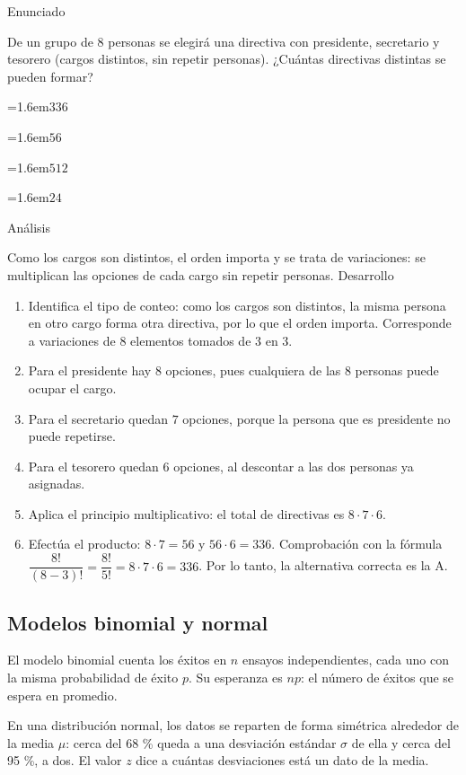 \documentclass[10pt,a4paper,twocolumn]{article}
\newcommand{\alternativa}[2]{\par\noindent\hangindent=1.6em\hangafter=1\makebox[1.6em][l]{\tecla{#1}}#2\par}
\newcommand{\clave}[1]{\par\smallskip{\sffamily\footnotesize\color{esmeralda} Clave \teclaok{#1}}\par}
\begin{document}
\begin{ejemplo}
{\sffamily\footnotesize\color{zinc500} Enunciado}\par
De un grupo de 8 personas se elegirá una directiva con presidente, secretario y tesorero (cargos distintos, sin repetir personas). ¿Cuántas directivas distintas se pueden formar?
\alternativa{A}{$336$}
\alternativa{B}{$56$}
\alternativa{C}{$512$}
\alternativa{D}{$24$}
\clave{A}
{\sffamily\footnotesize\color{zinc500} Análisis}\par Como los cargos son distintos, el orden importa y se trata de variaciones: se multiplican las opciones de cada cargo sin repetir personas.
{\sffamily\footnotesize\color{zinc500} Desarrollo}
\begin{enumerate}
  \item Identifica el tipo de conteo: como los cargos son distintos, la misma persona en otro cargo forma otra directiva, por lo que el orden importa. Corresponde a variaciones de $8$ elementos tomados de $3$ en $3$.
  \item Para el presidente hay $8$ opciones, pues cualquiera de las 8 personas puede ocupar el cargo.
  \item Para el secretario quedan $7$ opciones, porque la persona que es presidente no puede repetirse.
  \item Para el tesorero quedan $6$ opciones, al descontar a las dos personas ya asignadas.
  \item Aplica el principio multiplicativo: el total de directivas es $8\cdot 7\cdot 6$.
  \item Efectúa el producto: $8\cdot 7 = 56$ y $56\cdot 6 = 336$. Comprobación con la fórmula $\dfrac{8!}{(8-3)!} = \dfrac{8!}{5!} = 8\cdot 7\cdot 6 = 336$. Por lo tanto, la alternativa correcta es la A.
\end{enumerate}
\end{ejemplo}

\subsection{Modelos binomial y normal}

El modelo binomial cuenta los éxitos en $n$ ensayos independientes, cada uno con la misma probabilidad de éxito $p$. Su esperanza es $np$: el número de éxitos que se espera en promedio.

En una distribución normal, los datos se reparten de forma simétrica alrededor de la media $\mu$: cerca del 68 \% queda a una desviación estándar $\sigma$ de ella y cerca del 95 \%, a dos. El valor $z$ dice a cuántas desviaciones está un dato de la media.
\end{document}
